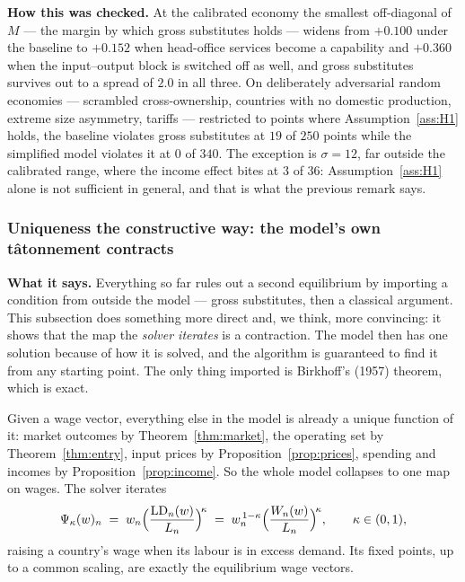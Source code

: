 \documentclass[11pt]{article}
\newcommand{\says}[1]{\smallskip\noindent\textbf{What it says.} #1\smallskip}
\newcommand{\checked}[1]{\smallskip\noindent\textbf{How this was checked.} #1\smallskip}
\theoremstyle{plain}
\theoremstyle{remark}
\theoremstyle{definition}
\begin{document}
\checked{At the calibrated economy the smallest off-diagonal of $M$ --- the
margin by which gross substitutes holds --- widens from $+0.100$ under the baseline to
$+0.152$ when head-office services become a capability and $+0.360$ when the
input--output block is switched off as well, and gross substitutes survives out to a
spread of $2.0$ in all three. On deliberately adversarial random economies --- scrambled
cross-ownership, countries with no domestic production, extreme size asymmetry, tariffs
--- restricted to points where Assumption~\ref{ass:H1} holds, the baseline violates
gross substitutes at $19$ of $250$ points while the simplified model violates it at
$0$ of $340$. The exception is $\sigma=12$, far outside the calibrated range, where the
income effect bites at $3$ of $36$: Assumption~\ref{ass:H1} alone is not sufficient
in general, and that is what the previous remark says.}

\subsubsection{Uniqueness the constructive way: the model's own tâtonnement contracts}
\label{sec:contraction}

\says{Everything so far rules out a second equilibrium by importing a condition from
outside the model --- gross substitutes, then a classical argument. This subsection does
something more direct and, we think, more convincing: it shows that the map the
\emph{solver iterates} is a contraction. The model then has one solution because of how
it is solved, and the algorithm is guaranteed to find it from any starting point. The
only thing imported is Birkhoff's (1957) theorem, which is exact.}

Given a wage vector, everything else in the model is already a unique function of it:
market outcomes by Theorem~\ref{thm:market}, the operating set by
Theorem~\ref{thm:entry}, input prices by Proposition~\ref{prop:prices}, spending and
incomes by Proposition~\ref{prop:income}. So the whole model collapses to one map on
wages. The solver iterates
\begin{equation}
  \Psi_\kappa(w)_n \;=\; w_n\Bigl(\frac{\mathrm{LD}_n(w)}{L_n}\Bigr)^{\!\kappa}
  \;=\; w_n^{\,1-\kappa}\Bigl(\frac{W_n(w)}{L_n}\Bigr)^{\!\kappa},
  \qquad \kappa\in(0,1),
  \label{eq:tat}
\end{equation}
raising a country's wage when its labour is in excess demand. Its fixed points, up to a
common scaling, are exactly the equilibrium wage vectors.
\end{document}
